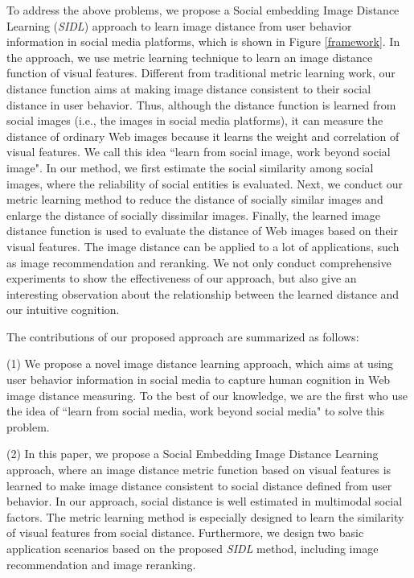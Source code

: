 To address the above problems, we propose a Social embedding Image Distance Learning (\emph{SIDL}) approach to learn image distance from user behavior information in social media platforms, which is shown in Figure \ref{framework}. In the approach, we use metric learning technique to learn an image distance function of visual features. Different from traditional metric learning work, our distance function aims at making image distance consistent to their social distance in user behavior. Thus, although the distance function is learned from social images (i.e., the images in social media platforms), it can measure the distance of ordinary Web images because it learns the weight and correlation of visual features. We call this idea ``learn from social image, work beyond social image". In our method, we first estimate the social similarity among social images, where the reliability of social entities is evaluated. Next, we conduct our metric learning method to reduce the distance of socially similar images and enlarge the distance of socially dissimilar images. Finally, the learned image distance function is used to evaluate the distance of Web images based on their visual features. The image distance can be applied to a lot of applications, such as image recommendation and reranking. We not only conduct comprehensive experiments to show the effectiveness of our approach, but also give an interesting observation about the relationship between the learned distance and our intuitive cognition.

The contributions of our proposed approach are summarized as follows:

(1) We propose a novel image distance learning approach, which aims at using user behavior information in social media to capture human cognition in Web image distance measuring. To the best of our knowledge, we are the first who use the idea of ``learn from social media, work beyond social media" to solve this problem.

(2) In this paper, we propose a Social Embedding Image Distance Learning approach, where an image distance metric function based on visual features is learned to make image distance consistent to social distance defined from user behavior. In our approach, social distance is well estimated in multimodal social factors. The metric learning method is especially designed to learn the similarity of visual features from social distance. Furthermore, we design two basic application scenarios based on the proposed \emph{SIDL} method, including image recommendation and image reranking.

